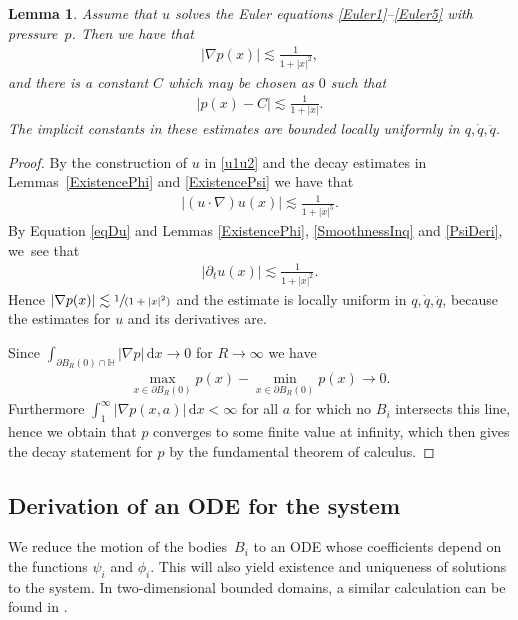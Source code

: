 \documentclass[JEP,XML,SOM,Unicode,published]{cedram}
\newcommand{\spfrac}[2]{\sfrac{#1}{(#2)}}
\newtheorem{lemma}[theorem]{Lemma}
\theoremstyle{definition}
\newcommand\dd{\,\mathrm{d}}
\newcommand\dx{\dd x}
\let\de\partial
\begin{document}
\begin{lemma}\label{Decayp}
Assume that $u$ solves the Euler equations \eqref{Euler1}--\eqref{Euler5} with pressure~$p$.
Then we have that
\begin{align*}|\nabla p(x)|\lesssim \frac{1}{1+|x|^2},
\end{align*}
and there is a constant $C$ which may be chosen as $0$ such that
\begin{align*}|p(x)-C|\lesssim \frac{1}{1+|x|}.
\end{align*}
The implicit constants in these estimates are bounded locally uniformly in $q,\dot{q},\ddot{q}$.
\end{lemma}
\begin{proof}
By the construction of $u$ in \eqref{u1u2} and the decay estimates in Lem\-mas~\ref{ExistencePhi} and \ref{ExistencePsi} we have that
\begin{align*}
|(u\cdot\nabla)u(x)|\lesssim \frac{1}{1+|x|^5}.
\end{align*}
By Equation \eqref{eqDu} and Lemmas \ref{ExistencePhi}, \ref{SmoothnessInq} and \ref{PsiDeri}, we~see that
\begin{align*}
|\de_tu(x)|\lesssim \frac{1}{1+|x|^2}.
\end{align*}
Hence $|\nabla p(x)|\lesssim \spfrac{1}{1+|x|^2}$ and the estimate is locally uniform in $q,\dot{q},\ddot{q}$, because the estimates for $u$ and its derivatives are.

Since $\int_{\de B_R(0)\cap \mathbb{H}}|\nabla p|\dx\to 0$ for $R\to\infty$ we have
\begin{align*}
\max_{x\in \de B_R(0)} p(x)-\min_{x\in \de B_R(0)} p(x)\to 0.
\end{align*}
Furthermore $\int_1^\infty |\nabla p(x,a)|\dx<\infty$ for all $a$ for which no $B_i$ intersects this line, hence we obtain that $p$ converges to some finite value at infinity, which then gives the decay statement for $p$ by the fundamental theorem of calculus.
\end{proof}

\subsection{Derivation of an ODE for the system}
We reduce the motion of the bodies~$B_i$ to an ODE whose coefficients depend on the functions $\psi_i$ and $\phi_i$. This will also yield existence and uniqueness of solutions to the system.
In two-dimensional bounded domains, a similar calculation can be found \eg in \cite{GlassMunnierSueur2}.
\end{document}
